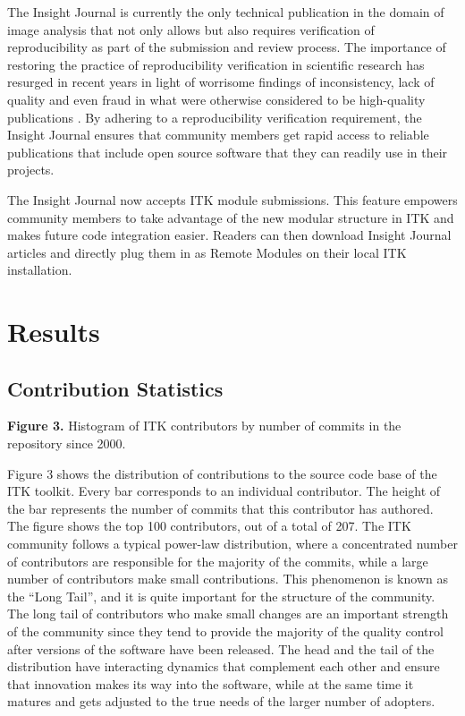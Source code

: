 \documentclass{frontiersENG} %
\begin{document}
The Insight Journal is currently the only technical publication in the domain
of image analysis that not only allows but also requires verification of
reproducibility as part of the submission and review process. The importance of
restoring the practice of reproducibility verification in scientific research
has resurged in recent years in light of worrisome findings of inconsistency,
lack of quality and even fraud in what were otherwise considered to be
high-quality publications \cite{Begley2012}. By adhering to a reproducibility
verification requirement, the Insight Journal ensures that community members
get rapid access to reliable publications that include open source software
that they can readily use in their projects.

The Insight Journal now accepts ITK module submissions. This feature empowers
community members to take advantage of the new modular structure in ITK and
makes future code integration easier. Readers can then download Insight Journal
articles and directly plug them in as Remote Modules on their local ITK
installation.




\section{Results}



\subsection{Contribution Statistics}

\textbf{Figure 3. }{Histogram of ITK contributors by number of commits in the repository since 2000.}\label{fig:03}

Figure 3 shows the distribution of contributions
to the source code base of the ITK toolkit. Every bar corresponds to an individual
contributor. The height of the bar represents the number of commits that this
contributor has authored. The figure shows the top 100 contributors, out of a
total of 207. The ITK community follows a typical power-law distribution, where
a concentrated number of contributors are responsible for the majority of the
commits, while a large number of contributors make small contributions.  This
phenomenon is known as the ``Long Tail'', and it is quite important for the
structure of the community. The long tail of contributors who make small
changes are an important strength of the community since they tend to provide
the majority of the quality control after versions of the software have been
released. The head and the tail of the distribution have interacting dynamics
that complement each other and ensure that innovation makes its way into the
software, while at the same time it matures and gets adjusted to the true needs
of the larger number of adopters.
\end{document}
